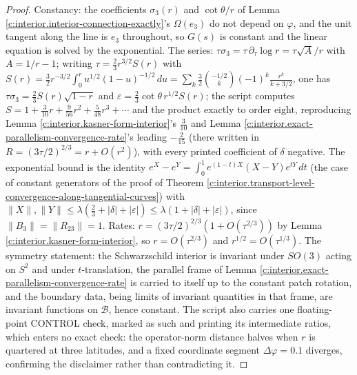 \documentclass[11pt]{article}
\theoremstyle{definition}
\theoremstyle{plain}
\begin{document}
\begin{proof}
Constancy: the coefficients $\sigma_{3}(r)$ and $\cot\theta/r$ of Lemma \ref{c:interior.interior-connection-exactly}'s $\Omega(e_{3})$ do not depend on $\varphi$, and the unit tangent along the line is $e_{3}$ throughout, so $G(s)$ is constant and the linear equation is solved by the exponential. The series: $\tau\sigma_{3} = \tau\,\partial_{\tau}\log r = \tau\sqrt{A}/r$ with $A = 1/r - 1$; writing $\tau = \tfrac23 r^{3/2} S(r)$ with $S(r) = \tfrac32 r^{-3/2}\int_{0}^{r} u^{1/2}(1-u)^{-1/2}\,du = \sum_{k} \tfrac{3}{2}\binom{-1/2}{k}(-1)^{k}\frac{r^{k}}{k + 3/2}$, one has $\tau\sigma_{3} = \tfrac23 S(r)\sqrt{1 - r}$ and $\varepsilon = \tfrac23 \cot\theta\, r^{1/2} S(r)$; the script computes $S = 1 + \tfrac{3}{10} r + \tfrac{9}{56} r^{2} + \tfrac{5}{48} r^{3} + \cdots$ and the product exactly to order eight, reproducing Lemma \ref{c:interior.kasner-form-interior}'s $\tfrac{3}{10}$ and Lemma \ref{c:interior.exact-parallelism-convergence-rate}'s leading $-\tfrac{2}{15}$ (there written in $R = (3\tau/2)^{2/3} = r + O(r^{2})$), with every printed coefficient of $\delta$ negative. The exponential bound is the identity $e^{X} - e^{Y} = \int_{0}^{1} e^{(1-t)X}(X - Y)e^{tY}\,dt$ (the case of constant generators of the proof of Theorem \ref{c:interior.transport-level-convergence-along-tangential-curves}) with $\|X\|, \|Y\| \le \lambda(\tfrac23 + |\delta| + |\varepsilon|) \le \lambda(1 + |\delta| + |\varepsilon|)$, since $\|B_3\| = \|R_{23}\| = 1$. Rates: $r = (3\tau/2)^{2/3}(1 + O(\tau^{2/3}))$ by Lemma \ref{c:interior.kasner-form-interior}, so $r = O(\tau^{2/3})$ and $r^{1/2} = O(\tau^{1/3})$. The symmetry statement: the Schwarzschild interior is invariant under $SO(3)$ acting on $S^{2}$ and under $t$-translation, the parallel frame of Lemma \ref{c:interior.exact-parallelism-convergence-rate} is carried to itself up to the constant patch rotation, and the boundary data, being limits of invariant quantities in that frame, are invariant functions on $\mathcal{B}$, hence constant. The script also carries one floating-point CONTROL check, marked as such and printing its intermediate ratios, which enters no exact check: the operator-norm distance halves when $r$ is quartered at three latitudes, and a fixed coordinate segment $\Delta\varphi = 0.1$ diverges, confirming the disclaimer rather than contradicting it.

\end{proof}
\end{document}
